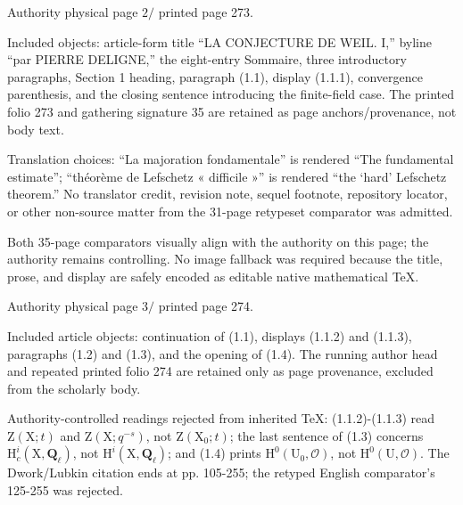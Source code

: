 \documentclass[10pt,leqno]{article}
\begin{document}
\noindent Authority physical page \(2 /\) printed page 273.\par

\noindent Included objects: article-form title “LA CONJECTURE DE WEIL. \(\mathrm{I}\),” byline “par PIERRE DELIGNE,” the eight-entry Sommaire, three introductory paragraphs, Section 1 heading, paragraph (1.1), display (1.1.1), convergence parenthesis, and the closing sentence introducing the finite-field case. The printed folio 273 and gathering signature 35 are retained as page anchors/provenance, not body text.\par

\noindent Translation choices: “La majoration fondamentale” is rendered “The fundamental estimate”; “théorème de Lefschetz « difficile »” is rendered “the ‘hard’ Lefschetz theorem.” No translator credit, revision note, sequel footnote, repository locator, or other non-source matter from the 31-page retypeset comparator was admitted.\par

\noindent Both 35-page comparators visually align with the authority on this page; the authority remains controlling. No image fallback was required because the title, prose, and display are safely encoded as editable native mathematical TeX.\par

\clearpage

\label{physical-3}\par\smallskip

\noindent Authority physical page \(3 /\) printed page 274.\par

\noindent Included article objects: continuation of (1.1), displays (1.1.2) and (1.1.3), paragraphs (1.2) and (1.3), and the opening of (1.4). The running author head and repeated printed folio 274 are retained only as page provenance, excluded from the scholarly body.\par

\noindent Authority-controlled readings rejected from inherited TeX: (1.1.2)-(1.1.3) read \(\mathrm{Z}(\mathrm{X};t)\) and \(\mathrm{Z}(\mathrm{X};q^{- s})\), not \(\mathrm{Z}(\mathrm{X}_{0};t)\); the last sentence of (1.3) concerns \(\mathrm{H}_{c}^{i}(\mathrm{X},\mathbf{Q}_{\ell })\), not \(\mathrm{H}^{i}(\mathrm{X},\mathbf{Q}_{\ell })\); and (1.4) prints \(\mathrm{H}^{0}(\mathrm{U}_{0},\mathcal{O})\), not \(\mathrm{H}^{0}(\mathrm{U},\mathcal{O})\). The Dwork/Lubkin citation ends at pp. 105-255; the retyped English comparator’s 125-255 was rejected.\par
\end{document}
